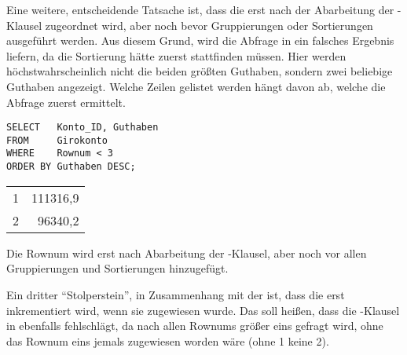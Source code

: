           Eine weitere, entscheidende Tatsache ist, dass die  erst nach der Abarbeitung der \WHERE-Klausel zugeordnet wird, aber noch bevor Gruppierungen oder Sortierungen ausgef\"uhrt werden. Aus diesem Grund, wird die Abfrage in  ein falsches Ergebnis liefern, da die Sortierung h\"atte zuerst stattfinden m\"ussen. Hier werden h\"ochstwahrscheinlich nicht die beiden gr\"o\ss{}ten Guthaben, sondern zwei beliebige Guthaben angezeigt. Welche Zeilen gelistet werden h\"angt davon ab, welche die Abfrage zuerst ermittelt.
          \begin{lstlisting}[language=oracle_sql,caption={Falsche Anwendung der Rownum-Pseudospalte},label=sql06_12]
SELECT   Konto_ID, Guthaben
FROM     Girokonto
WHERE    Rownum < 3
ORDER BY Guthaben DESC;
          \end{lstlisting}
          \begin{center}
            \begin{small}
              \tablehead{}

              \begin{oraclesql}
                \begin{supertabular}{rr}
                  1 & 111316,9 \\
                  2 & 96340,2 \\
                \end{supertabular}
              \end{oraclesql}
            \end{small}
          \end{center}
          \begin{merke}
            Die Rownum wird erst nach Abarbeitung der \WHERE-Klausel, aber noch vor allen Gruppierungen und Sortierungen hinzugef\"ugt.
          \end{merke}
          Ein dritter \enquote{Stolperstein}, in Zusammenhang mit der  ist, dass die  erst inkrementiert wird, wenn sie zugewiesen wurde. Das soll hei\ss{}en, dass die \WHERE-Klausel in  ebenfalls fehlschl\"agt, da nach allen Rownums gr\"o\ss{}er eins gefragt wird, ohne das Rownum eins jemals zugewiesen worden w\"are (ohne 1 keine 2).
